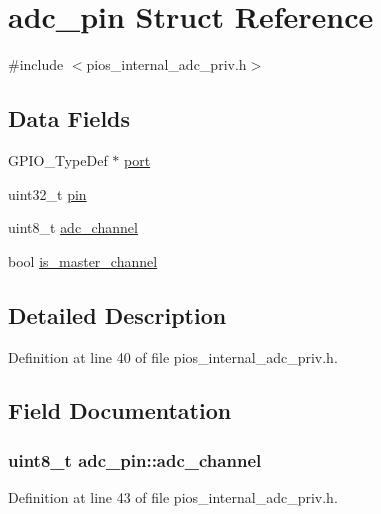 \hypertarget{structadc__pin}{\section{adc\-\_\-pin \-Struct \-Reference}
\label{structadc__pin}
}


{\ttfamily \#include $<$pios\-\_\-internal\-\_\-adc\-\_\-priv.\-h$>$}

\subsection*{\-Data \-Fields}
\begin{DoxyCompactItemize}
\item 
\-G\-P\-I\-O\-\_\-\-Type\-Def $\ast$ \hyperlink{structadc__pin_ac1b069f460728fe2ae908639a9e06351}{port}
\item 
uint32\-\_\-t \hyperlink{structadc__pin_a20be5a8bbbb9954f4d52fb44da32c9e3}{pin}
\item 
uint8\-\_\-t \hyperlink{structadc__pin_a0f5659e308eca5b02d586383fbf5e1ae}{adc\-\_\-channel}
\item 
bool \hyperlink{structadc__pin_a6c9e5136cd84787a0047a66976b5a170}{is\-\_\-master\-\_\-channel}
\end{DoxyCompactItemize}


\subsection{\-Detailed \-Description}


\-Definition at line 40 of file pios\-\_\-internal\-\_\-adc\-\_\-priv.\-h.



\subsection{\-Field \-Documentation}
\hypertarget{structadc__pin_a0f5659e308eca5b02d586383fbf5e1ae}{
\subsubsection[{adc\-\_\-channel}]{\setlength{\rightskip}{0pt plus 5cm}uint8\-\_\-t {\bf adc\-\_\-pin\-::adc\-\_\-channel}}}\label{structadc__pin_a0f5659e308eca5b02d586383fbf5e1ae}


\-Definition at line 43 of file pios\-\_\-internal\-\_\-adc\-\_\-priv.\-h.

